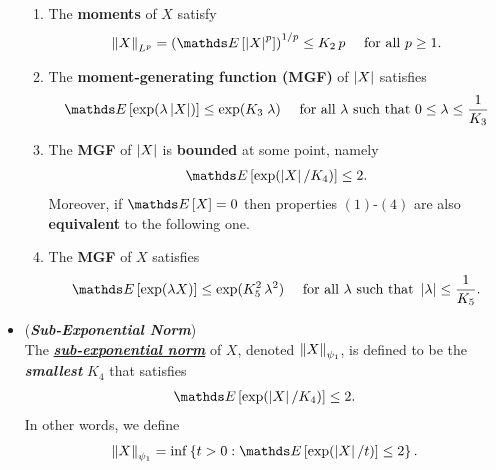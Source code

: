 \documentclass[11pt]{article}
\begin{document}
\begin{itemize}
\begin{proposition}
\begin{enumerate}
\item The \textbf{moments} of $X$ satisfy
\begin{align*}
\norm{X}{L^p} = \paren{\E{}{\abs{X}^p}}^{1/p} \le K_2\, p\quad \text{ for all }p \ge 1.
\end{align*}

\item The \textbf{moment-generating function (MGF)} of $\left\lvert X \right\rvert$ satisfies
\begin{align*}
\E{}{\exp(\lambda \abs{X})} \le \exp(K_3\;\lambda) \quad \text{ for all $\lambda$ such that $0 \le \lambda \le \frac{1}{K_3}$}
\end{align*}

\item The \textbf{MGF} of $\left\lvert X \right\rvert$ is \textbf{bounded} at some point, namely
\begin{align*}
\E{}{\exp(\abs{X} / K_4)} \le 2.
\end{align*}
Moreover, if $\E{}{X} = 0$ then properties $(1)$-$(4)$ are also \textbf{equivalent} to the following one.

\item The \textbf{MGF} of $X$ satisfies
\begin{align*}
\E{}{\exp(\lambda X)} \le  \exp(K_5^2\,\lambda^2)\quad\text{ for all }\lambda \text{ such that } \abs{\lambda} \le \frac{1}{K_5}.
\end{align*}
\end{enumerate}
\end{proposition}



\item \begin{definition} (\textbf{\emph{Sub-Exponential Norm}}) \\
The \underline{\emph{\textbf{sub-exponential norm}}} of $X$, denoted $\left\|X\right\|_{\psi_1}$, is defined
to be the \emph{\textbf{smallest}} $K_4$ that satisfies 
\begin{align*}
\E{}{\exp(\abs{X} / K_4)} \le 2.
\end{align*} In other words, we define
\begin{align}
\norm{X}{\psi_1}= \inf\set{t > 0: \E{}{\exp(\abs{X} / t)} \le 2}.  \label{eqn: sub_gaussian_norm}
\end{align}
\end{definition}


\end{itemize}
\end{document}
